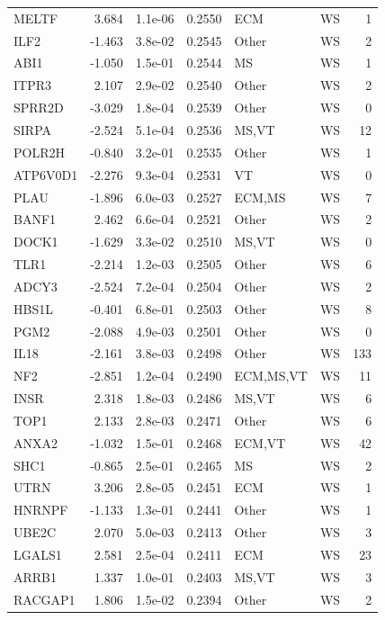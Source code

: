 \begin{table}[ht]
\begin{tabular}{lrlrllr}
  MELTF & 3.684 & 1.1e-06 & 0.2550 & ECM & WS & 1 \\ 
  ILF2 & -1.463 & 3.8e-02 & 0.2545 & Other & WS & 2 \\ 
  ABI1 & -1.050 & 1.5e-01 & 0.2544 & MS & WS & 1 \\ 
  ITPR3 & 2.107 & 2.9e-02 & 0.2540 & Other & WS & 2 \\ 
  SPRR2D & -3.029 & 1.8e-04 & 0.2539 & Other & WS & 0 \\ 
  SIRPA & -2.524 & 5.1e-04 & 0.2536 & MS,VT & WS & 12 \\ 
  POLR2H & -0.840 & 3.2e-01 & 0.2535 & Other & WS & 1 \\ 
  ATP6V0D1 & -2.276 & 9.3e-04 & 0.2531 & VT & WS & 0 \\ 
  PLAU & -1.896 & 6.0e-03 & 0.2527 & ECM,MS & WS & 7 \\ 
  BANF1 & 2.462 & 6.6e-04 & 0.2521 & Other & WS & 2 \\ 
  DOCK1 & -1.629 & 3.3e-02 & 0.2510 & MS,VT & WS & 0 \\ 
  TLR1 & -2.214 & 1.2e-03 & 0.2505 & Other & WS & 6 \\ 
  ADCY3 & -2.524 & 7.2e-04 & 0.2504 & Other & WS & 2 \\ 
  HBS1L & -0.401 & 6.8e-01 & 0.2503 & Other & WS & 8 \\ 
  PGM2 & -2.088 & 4.9e-03 & 0.2501 & Other & WS & 0 \\ 
  IL18 & -2.161 & 3.8e-03 & 0.2498 & Other & WS & 133 \\ 
  NF2 & -2.851 & 1.2e-04 & 0.2490 & ECM,MS,VT & WS & 11 \\ 
  INSR & 2.318 & 1.8e-03 & 0.2486 & MS,VT & WS & 6 \\ 
  TOP1 & 2.133 & 2.8e-03 & 0.2471 & Other & WS & 6 \\ 
  ANXA2 & -1.032 & 1.5e-01 & 0.2468 & ECM,VT & WS & 42 \\ 
  SHC1 & -0.865 & 2.5e-01 & 0.2465 & MS & WS & 2 \\ 
  UTRN & 3.206 & 2.8e-05 & 0.2451 & ECM & WS & 1 \\ 
  HNRNPF & -1.133 & 1.3e-01 & 0.2441 & Other & WS & 1 \\ 
  UBE2C & 2.070 & 5.0e-03 & 0.2413 & Other & WS & 3 \\ 
  LGALS1 & 2.581 & 2.5e-04 & 0.2411 & ECM & WS & 23 \\ 
  ARRB1 & 1.337 & 1.0e-01 & 0.2403 & MS,VT & WS & 3 \\ 
  RACGAP1 & 1.806 & 1.5e-02 & 0.2394 & Other & WS & 2 \\ 

\end{tabular}
\end{table}
